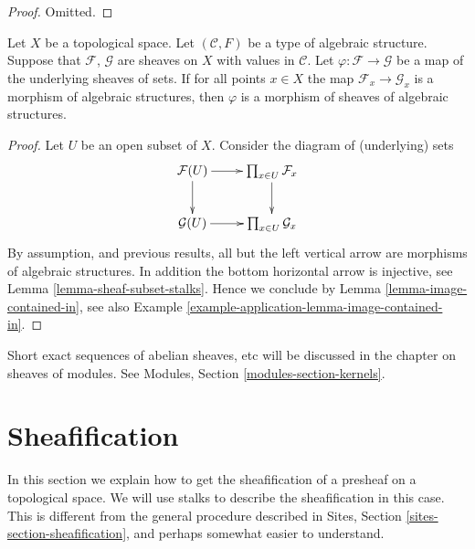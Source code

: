 \begin{proof}
Omitted.
\end{proof}


\begin{lemma}
\label{lemma-check-homomorphism-stalks}
Let $X$ be a topological space.
Let $(\mathcal{C}, F)$ be a type of algebraic structure.
Suppose that $\mathcal{F}$, $\mathcal{G}$ are sheaves on $X$
with values in $\mathcal{C}$.
Let $\varphi : \mathcal{F} \to \mathcal{G}$
be a map of the underlying sheaves of sets.
If for all points $x \in X$ the map
$\mathcal{F}_x \to \mathcal{G}_x$
is a morphism of algebraic structures,
then $\varphi$ is a morphism of sheaves of algebraic structures.
\end{lemma}

\begin{proof}
Let $U$ be an open subset of $X$. Consider the diagram of
(underlying) sets
$$
\xymatrix{
\mathcal{F}(U) \ar[r] \ar[d] &
\prod_{x \in U} \mathcal{F}_x \ar[d] \\
\mathcal{G}(U) \ar[r] &
\prod_{x \in U} \mathcal{G}_x
}
$$
By assumption, and previous results, all but the left vertical
arrow are morphisms of algebraic structures. In addition the
bottom horizontal arrow is injective,
see Lemma \ref{lemma-sheaf-subset-stalks}.
Hence we conclude by Lemma \ref{lemma-image-contained-in},
see also Example \ref{example-application-lemma-image-contained-in}.
\end{proof}

\noindent
Short exact sequences of abelian sheaves, etc will be discussed
in the chapter on sheaves of modules. See
Modules, Section \ref{modules-section-kernels}.




\section{Sheafification}
\label{section-sheafification}

\noindent
In this section we explain how to get the sheafification
of a presheaf on a topological space. We will use stalks
to describe the sheafification in this case. This is different
from the general procedure described in Sites, Section
\ref{sites-section-sheafification}, and perhaps somewhat
easier to understand.

